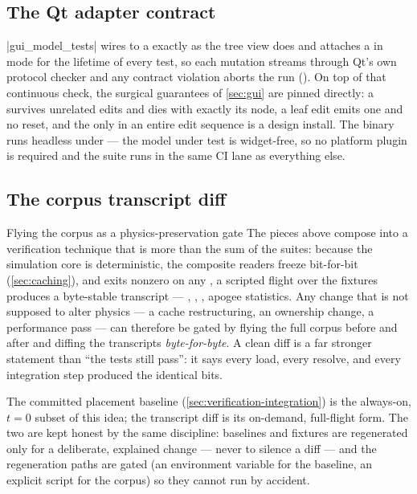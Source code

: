 \subsection{The Qt adapter contract}\label{sec:verification-gui}

\cppinline|gui_model_tests| wires  to a  exactly as the
tree view does and attaches a  in  mode for the
lifetime of every test, so each mutation streams through Qt's own protocol checker and any
contract violation aborts the run (). On top of that
continuous check, the surgical guarantees of \cref{sec:gui} are pinned directly: a
 survives unrelated edits and dies with exactly its node, a leaf edit
emits one  and no reset, and the only  in an entire edit
sequence is a design install. The binary runs headless under  --- the
model under test is widget-free, so no platform plugin is required and the suite runs in the
same CI lane as everything else.

\subsection{The corpus transcript diff}\label{sec:verification-corpus}

\begin{qrcallout}{Flying the corpus as a physics-preservation gate}
The pieces above compose into a verification technique that is more than the sum of the suites:
because the simulation core is deterministic, the composite readers freeze bit-for-bit
(\cref{sec:caching}), and  exits nonzero on any , a scripted flight
over the  fixtures produces a byte-stable transcript ---
, , , apogee statistics. Any change that is not supposed to alter
physics --- a cache restructuring, an ownership change, a performance pass --- can therefore be
gated by flying the full corpus before and after and diffing the transcripts
\emph{byte-for-byte}. A clean diff is a far stronger statement than ``the tests still pass'': it
says every load, every resolve, and every integration step produced the identical bits.
\end{qrcallout}

The committed placement baseline (\cref{sec:verification-integration}) is the always-on,
$t{=}0$ subset of this idea; the transcript diff is its on-demand, full-flight form. The two are
kept honest by the same discipline: baselines and fixtures are regenerated only for a
deliberate, explained change --- never to silence a diff --- and the regeneration paths are
gated (an environment variable for the baseline, an explicit script for the corpus) so they
cannot run by accident.

